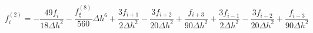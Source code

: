 \begin{equation} 
f^{{(2)}}_{i} = - \frac{49 f_{i}}{18 {\Delta h}^{2}} - \frac{f^{{(8)}}_{{\xi}}}{560} {\Delta h}^{6} + \frac{3 f_{{i+1}}}{2 {\Delta h}^{2}} - \frac{3 f_{{i+2}}}{20 {\Delta h}^{2}} + \frac{f_{{i+3}}}{90 {\Delta h}^{2}} + \frac{3 f_{{i-1}}}{2 {\Delta h}^{2}} - \frac{3 f_{{i-2}}}{20 {\Delta h}^{2}} + \frac{f_{{i-3}}}{90 {\Delta h}^{2}}
 \end{equation} 
